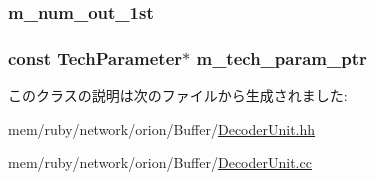 \label{classDecoderUnit_a94b1781415b831d43d30f2fd5abda267}
\hypertarget{classDecoderUnit_aa18c8ca6786b8e752266336f6ef7e5d4}{
\subsubsection[{m\_\-num\_\-out\_\-1st}]{ {\bf m\_\-num\_\-out\_\-1st}}}
\label{classDecoderUnit_aa18c8ca6786b8e752266336f6ef7e5d4}
\hypertarget{classDecoderUnit_a11d1644aa2bfe0e16783dface6fadf13}{
\subsubsection[{m\_\-tech\_\-param\_\-ptr}]{\setlength{\rightskip}{0pt plus 5cm}const {\bf TechParameter}$\ast$ {\bf m\_\-tech\_\-param\_\-ptr}}}
\label{classDecoderUnit_a11d1644aa2bfe0e16783dface6fadf13}


このクラスの説明は次のファイルから生成されました:\begin{DoxyCompactItemize}
\item 
mem/ruby/network/orion/Buffer/\hyperlink{DecoderUnit_8hh}{DecoderUnit.hh}\item 
mem/ruby/network/orion/Buffer/\hyperlink{DecoderUnit_8cc}{DecoderUnit.cc}\end{DoxyCompactItemize}
